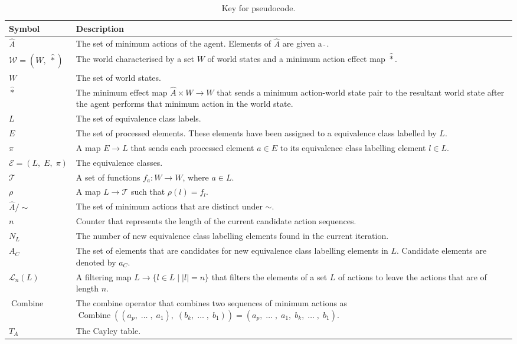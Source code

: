 \begin{fullwidth}
\begin{table}[H]
\begin{tabularx}{\textwidth}{lX}
\toprule
\textbf{Symbol} & \textbf{Description} \\
\midrule
$\hat{A}$ & The set of minimum actions of the agent. Elements of $\hat{A}$ are given a $\hat{\ }$. \\
$\mathscr{W} = (W, \; \hat{\ast})$ & The world characterised by a set $W$ of world states and a minimum action effect map $\hat{\ast}$. \\
$W$ & The set of world states. \\
$\hat{\ast}$ & The minimum effect map $\hat{A} \times W \to W$ that sends a minimum action-world state pair to the resultant world state after the agent performs that minimum action in the world state. \\
$L$ & The set of equivalence class labels. \\
$E$ & The set of processed elements. These elements have been assigned to a equivalence class labelled by $L$. \\
$\pi$ & A map $E \to L$ that sends each processed element $a \in E$ to its equivalence class labelling element $l \in L$. \\
$\mathcal{E} = (L, \; E, \; \pi)$ & The equivalence classes. \\
$\mathcal{T}$ & A set of functions $f_{a}: W \to W$, where $a \in L$. \\
$\rho$ & A map $L \to \mathcal{T}$ such that $\rho(l) = f_{l}$. \\
$\hat{A}/\sim$ & The set of minimum actions that are distinct under $\sim$. \\
$n$ & Counter that represents the length of the current candidate action sequences. \\
$N_{L}$ & The number of new equivalence class labelling elements found in the current iteration. \\
$A_{C}$ & The set of elements that are candidates for new equivalence class labelling elements in $L$. Candidate elements are denoted by $a_{C}$. \\
$\mathcal{L}_{n}(L)$ & A filtering map $L \to \{ l \in L \mid |l| = n \}$ that filters the elements of a set $L$ of actions to leave the actions that are of length $n$. \\
$\operatorname{Combine}$ & The combine operator that combines two sequences of minimum actions as $\operatorname{Combine}((a_{p}, \; \dots \;, \; a_{1}), \; (b_{k}, \; \dots \; , \; b_{1})) = (a_{p}, \; \dots \; , \; a_{1}, \; b_{k}, \; \dots \; , \; b_{1})$. \\
$T_{A}$ & The Cayley table. \\
\bottomrule
\end{tabularx}
\caption{Key for pseudocode.}
\label{tab:pseudocode_key}
\end{table}
\end{fullwidth}


